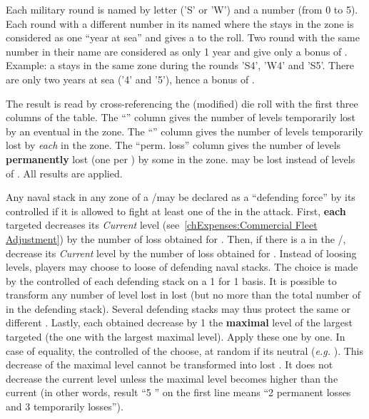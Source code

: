 \bparag Each military round is named by letter ('S' or 'W') and a number (from
0 to 5).
\bparag Each round with a different number in its named where the \corsaire
stays in the zone is considered as one ``year at sea'' and gives a 
to the roll.
\bparag Two round with the same number in their name are considered as only 1
year and give only a bonus of .
\bparag Example: a \corsaire stays in the same zone during the rounds 'S4',
'W4' and 'S5'. There are only two years at sea ('4' and '5'), hence a bonus of
.


\bparag The result is read by cross-referencing the (modified) die roll with
the first three columns of the table.
\bparag The ``\TradeFLEET\faceplus'' column gives the number of levels
temporarily lost by an eventual \TradeFLEET\faceplus in the zone.
\bparag The ``\TradeFLEET\facemoins'' column gives the number of levels
temporarily lost by \emph{each} \TradeFLEET\facemoins in the zone.
\bparag The ``perm. loss'' column gives the number of levels
\textbf{permanently} lost (one per \textetoile) by some \TradeFLEET in the
zone.
\bparag \ND may be lost instead of levels of \TradeFLEET.
\bparag All results are applied.


 Any naval stack in any zone of a \STZ/\CTZ may
be declared as a ``defending force'' by its controlled if it is allowed to
fight at least one of the \corsaire in the attack.
\bparag First, \textbf{each} targeted \TradeFLEET\facemoins decreases its
\emph{Current} level (see~\ref{chExpenses:Commercial Fleet Adjustment}) by the
number of loss obtained for \TradeFLEET\facemoins.
\bparag Then, if there is a \TradeFLEET\faceplus in the \STZ/\CTZ, decrease
its \emph{Current} level by the number of loss obtained for
\TradeFLEET\faceplus.
\bparag Instead of loosing \TradeFLEET levels, players may choose to loose \ND
of defending naval stacks. The choice is made by the controlled of each
defending stack on a 1 for 1 basis. It is possible to transform any number of
level lost in \ND lost (but no more than the total number of \ND in the
defending stack). Several defending stacks may thus protect the same or
different \TradeFLEET.
\bparag Lastly, each \textetoile obtained decrease by 1 the \textbf{maximal}
level of the largest targeted \TradeFLEET (the one with the largest maximal
level). Apply these \textetoile one by one. In case of equality, the
controlled of the \corsaire choose, at random if its neutral (\emph{e.g.}
).
\bparag This decrease of the maximal level cannot be transformed into lost
\ND. It does not decrease the current level unless the maximal level becomes
higher than the current (in other words, result ``5 \textetoile\textetoile''
on the first line means ``2 permanent losses and 3 temporarily losses'').

